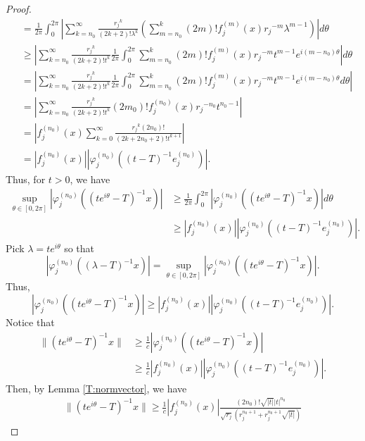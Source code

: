 \documentclass[12pt]{amsart}
\numberwithin{equation}{section}
\theoremstyle{plain}
\theoremstyle{definition}
\begin{document}
\begin{proof}
\begin{align*}
&=
\frac{1}{2\pi}\int_{0}^{2\pi} \left|\sum\limits_{k=n_0}^{\infty}\frac{{r_j}^k}{(2k+2)!\lambda^{k}}\left(\sum_{m=n_0}^{k}(2m)!f_j^{(m)}(x){r_j}^{-m}\lambda^{m-1}\right)\right|d\theta\\
&\geq
\left|\sum\limits_{k=n_0}^{\infty}\frac{{r_j}^k}{(2k+2)!t^{k}}\frac{1}{2\pi}\int_{0}^{2\pi}\sum\limits_{m=n_0}^{k}(2m)!f_j^{(m)}(x){r_j}^{-m}t^{m-1}e^{i(m-n_0)\theta}\right|d\theta\\
&=
\left|\sum\limits_{k=n_0}^{\infty}\frac{{r_j}^k}{(2k+2)!t^{k}}\frac{1}{2\pi}\int_{0}^{2\pi}\sum\limits_{m=n_0}^{k}(2m)!f_j^{(m)}(x){r_j}^{-m}t^{m-1}e^{i(m-n_0)\theta}d\theta\right|\\
&=
\left|\sum\limits_{k=n_0}^{\infty}\frac{{r_j}^k}{(2k+2)!t^{k}}(2m_0)!f_j^{(n_0)}(x){r_j}^{-n_0}t^{n_0-1}\right|\\
&=\left|f_j^{(n_0)}(x)\sum\limits_{k=0}^{\infty}\frac{{r_j}^k(2n_0)!}{(2k+2n_0+2)!t^{k+1}}\right|\\
&=
\left|f_j^{(n_0)}(x)\right|\left|\varphi_j^{(n_0)}\left((t-T)^{-1}e_j^{(n_0)}\right)\right|.
\end{align*}
Thus, for $t>0$, we have
\begin{align*}
\sup_{\theta\in[0,2\pi]}\left|\varphi_{j}^{(n_0)}\left((te^{i\theta}-T)^{-1}x\right)\right|
&\geq{\frac{1}{2\pi}\int_{0}^{2\pi}\left|\varphi_{j}^{(n_0)}\left((te^{i\theta}-T)^{-1}x\right)\right| d\theta}\\
&\geq \left|f_j^{(n_0)}(x)\right|\left|\varphi_j^{(n_0)}\left((t-T)^{-1}e_j^{(n_0)}\right)\right|.
\end{align*}
Pick $\lambda=te^{i\theta}$ so that
$$\left|\varphi_{j}^{(n_0)}\left((\lambda-T)^{-1}x\right)\right|=\sup_{\theta\in[0,2\pi]}\left|\varphi_{j}^{(n_0)}\left((te^{i\theta}-T)^{-1}x\right)\right|.$$
Thus,
$$\left|\varphi_{j}^{(n_0)}\left((te^{i\theta}-T)^{-1}x\right)\right|\geq \left|f_j^{(n_0)}(x)\right|\left|\varphi_j^{(n_0)}\left((t-T)^{-1}e_j^{(n_0)}\right)\right|.$$
Notice that
\begin{align*}
\|(te^{i\theta}-T)^{-1}x\|
&\geq \frac{1}{c}\left|\varphi_{j}^{(n_0)}\left((te^{i\theta}-T)^{-1}x\right)\right|\\
&\geq \frac{1}{c}\left|f_j^{(n_0)}(x)\right|\left|\varphi_j^{(n_0)}\left((t-T)^{-1}e_j^{(n_0)}\right)\right|.
\end{align*}
Then, by Lemma \ref{T:normvector}, we have
\begin{align*}\label{F:re}
\|(te^{i\theta}-T)^{-1}x\|
\geq
\frac{1}{c}\left|f_j^{(n_0)}(x)\right|\frac{(2n_0)!\sqrt{|t|}|t|^{n_0}}{\sqrt{r_j}(r_j^{n_0+1}+r_j^{n_0+1}\sqrt{|t|})}

\end{align*}
\end{proof}
\end{document}
